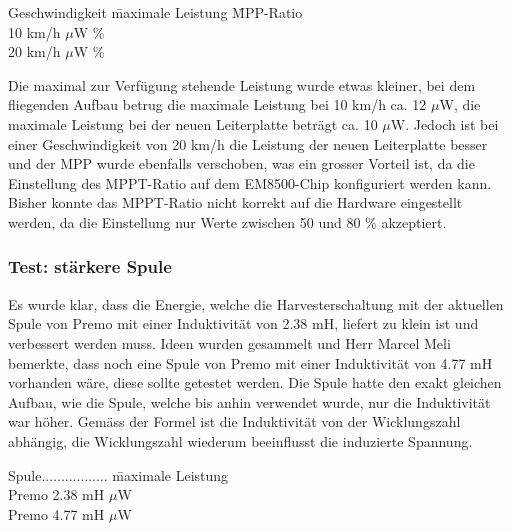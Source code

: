 
\begin{tabbing}
    Geschwindigkeit   \quad\= maximale Leistung    \quad\= MPP-Ratio\\[0.8ex]
    10 km/h         $\mu$W   \%\\
	20 km/h         $\mu$W   \%\\
	
\end{tabbing} %

Die maximal zur Verfügung stehende Leistung wurde etwas kleiner, bei dem fliegenden Aufbau betrug die maximale Leistung bei 10 km/h ca. 12 $\mu$W, die maximale Leistung bei der neuen Leiterplatte beträgt ca. 10 $\mu$W. Jedoch ist bei einer Geschwindigkeit von 20 km/h die Leistung der neuen Leiterplatte besser und der MPP wurde ebenfalls verschoben, was ein grosser Vorteil ist, da die Einstellung des MPPT-Ratio auf dem EM8500-Chip konfiguriert werden kann. Bisher konnte das MPPT-Ratio nicht korrekt auf die Hardware eingestellt werden, da die Einstellung nur Werte zwischen 50 und 80 \% akzeptiert.

\subsubsection{Test: stärkere Spule}

Es wurde klar, dass die Energie, welche die Harvesterschaltung mit der aktuellen Spule von Premo mit einer Induktivität von 2.38 mH, liefert zu klein ist und verbessert werden muss. Ideen wurden gesammelt und Herr Marcel Meli bemerkte, dass noch eine Spule von Premo mit einer Induktivität von 4.77 mH vorhanden wäre, diese sollte getestet werden. Die Spule hatte den exakt gleichen Aufbau, wie die Spule, welche bis anhin verwendet wurde, nur die Induktivität war höher. Gemäss der Formel  ist die Induktivität von der Wicklungszahl abhängig, die Wicklungszahl wiederum beeinflusst die induzierte Spannung.

\begin{tabbing}
    Spule.................   \quad\= maximale Leistung    \\[0.8ex]
    Premo 2.38 mH         $\mu$W\\
	Premo 4.77 mH         $\mu$W\\
	
\end{tabbing} %


